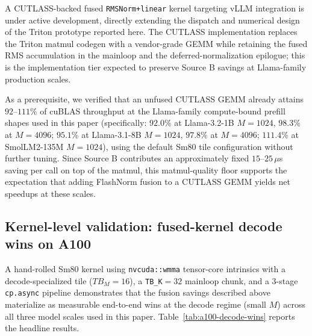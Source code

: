 \documentclass{article}
\begin{document}
A CUTLASS-backed fused \texttt{RMSNorm+linear} kernel targeting vLLM integration is under active development, directly extending the dispatch and numerical design of the Triton prototype reported here. The CUTLASS implementation replaces the Triton matmul codegen with a vendor-grade GEMM while retaining the fused RMS accumulation in the mainloop and the deferred-normalization epilogue; this is the implementation tier expected to preserve Source B savings at Llama-family production scales.

As a prerequisite, we verified that an unfused CUTLASS GEMM already attains $92$--$111$\% of cuBLAS throughput at the Llama-family compute-bound prefill shapes used in this paper (specifically: $92.0$\% at Llama-3.2-1B $M{=}1024$, $98.3$\% at $M{=}4096$; $95.1$\% at Llama-3.1-8B $M{=}1024$, $97.8$\% at $M{=}4096$; $111.4$\% at SmolLM2-135M $M{=}1024$), using the default Sm80 tile configuration without further tuning. Since Source B contributes an approximately fixed $15$--$25\,\mu$s saving per call on top of the matmul, this matmul-quality floor supports the expectation that adding FlashNorm fusion to a CUTLASS GEMM yields net speedups at these scales.

\subsection{Kernel-level validation: fused-kernel decode wins on A100}\label{app:a100-decode}

A hand-rolled Sm80 kernel using \texttt{nvcuda::wmma} tensor-core intrinsics with a decode-specialized tile ($TB_M{=}16$), a \texttt{TB\_K}$=32$ mainloop chunk, and a 3-stage \texttt{cp.async} pipeline demonstrates that the fusion savings described above materialize as measurable end-to-end wins at the decode regime (small $M$) across all three model scales used in this paper. Table~\ref{tab:a100-decode-wins} reports the headline results.
\end{document}
